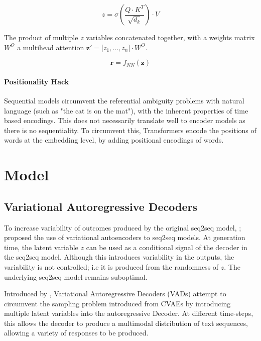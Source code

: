 \documentclass[12pt,twoside]{report}
\begin{document}
\begin{equation}
	z = \sigma(\frac{Q \cdot K^T}{\sqrt{d_k}})\cdot V
\end{equation}

The product of multiple $z$ variables concatenated together, with a weights matrix $W^O$ a multihead attention $\boldsymbol{z}' = \lbrack z_1,...,z_n \rbrack \cdot W^O$. 

\begin{equation}
	\boldsymbol{r} = f_{NN}(\boldsymbol{z})
\end{equation}

\subsubsection{Positionality Hack}

Sequential models circumvent the referential ambiguity problems with natural language (such as "the cat is on the mat"), with the inherent properties of time based encodings. This does not necessarily translate well to encoder models as there is no sequentiality. To circumvent this, Transformers encode the positions of words at the embedding level, by adding positional encodings of words.



\chapter{Model}


\section{Variational Autoregressive Decoders}

To increase variability of outcomes produced by the original seq2seq model, \cite{serban_hierarchical_2016}; \cite{zhao_learning_2017} proposed the use of variational autoencoders to seq2seq models. At generation time, the latent variable $z$ can be used as a conditional signal of the decoder in the seq2seq model. Although this introduces variability in the outputs, the variability is not controlled; i.e it is produced from the randomness of $z$. The underlying seq2seq model remains suboptimal.

Introduced by \cite{du_variational_2018}, Variational Autoregressive Decoders (VADs) attempt to circumvent the sampling problem introduced from CVAEs by introducing multiple latent variables into the autoregressive Decoder. At different time-steps, this allows the decoder to produce a multimodal distribution of text sequences, allowing a variety of responses to be produced. 
\end{document}
